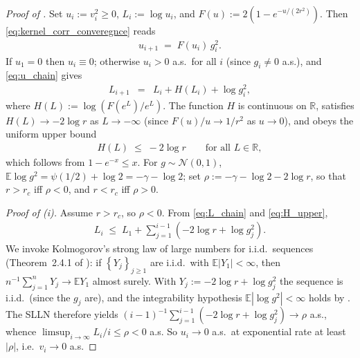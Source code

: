 \documentclass[10pt,a4paper]{amsart}
\newcommand{\Brack}[1]{\left( #1 \right)}
\newcommand{\Exp}[1]{\mathbb{E} #1}
\newcommand{\RR}{\mathbb{R}}
\newcommand{\Set}[1]{\left\{ #1 \right\}}
\newcommand{\mcN}{\mathcal{N}}
\begin{document}
\begin{proof}[Proof of ]
  Set $u_i := v_i^2 \ge 0$, $L_i := \log u_i$, and $F(u) := 2(1 - e^{-u/(2r^2)})$. Then \eqref{eq:kernel_corr_converegnce} reads
  \begin{eqnarray}
    \label{eq:u_chain}
    u_{i+1} \;=\; F(u_i)\,g_i^2.
  \end{eqnarray}
  If $u_1 = 0$ then $u_i \equiv 0$; otherwise $u_i > 0$ a.s.\ for all $i$ (since $g_i \ne 0$ a.s.), and \eqref{eq:u_chain} gives
  \begin{eqnarray}
    \label{eq:L_chain}
    L_{i+1} & = & L_i + H(L_i) + \log g_i^2,
  \end{eqnarray}
  where $H(L) := \log\Brack{F(e^L)/e^L}$.
  The function $H$ is continuous on $\RR$, satisfies $H(L) \to -2\log r$ as $L \to -\infty$ (since $F(u)/u \to 1/r^2$ as $u \to 0$), and obeys the uniform upper bound
  \begin{eqnarray}
    \label{eq:H_upper}
    H(L) \;\le\; -2\log r \qquad \text{for all } L \in \RR,
  \end{eqnarray}
  which follows from $1 - e^{-x} \le x$. For $g \sim \mcN(0,1)$, $\Exp{\log g^2} = \psi(1/2) + \log 2 = -\gamma - \log 2$; set $\rho := -\gamma - \log 2 - 2\log r$, so that $r > r_c$ iff $\rho < 0$, and $r < r_c$ iff $\rho > 0$.

  \emph{Proof of (i).} Assume $r > r_c$, so $\rho < 0$. From \eqref{eq:L_chain} and \eqref{eq:H_upper},
  \begin{eqnarray*}
    L_i \;\le\; L_1 + \sum_{j=1}^{i-1}\Brack{-2\log r + \log g_j^2}.
  \end{eqnarray*}
  We invoke Kolmogorov's strong law of large numbers for i.i.d.\ sequences (Theorem~2.4.1 of \cite{durrett2019probability}): if $\Set{Y_j}_{j \ge 1}$ are i.i.d.\ with $\Exp{|Y_1|} < \infty$, then $n^{-1}\sum_{j=1}^n Y_j \to \Exp{Y_1}$ almost surely. With $Y_j := -2\log r + \log g_j^2$ the sequence is i.i.d.\ (since the $g_j$ are), and the integrability hypothesis $\Exp{|\log g^2|} < \infty$ holds by . The SLLN therefore yields $(i-1)^{-1}\sum_{j=1}^{i-1}(-2\log r + \log g_j^2) \to \rho$ a.s., whence $\limsup_{i\to\infty} L_i/i \le \rho < 0$ a.s. So $u_i \to 0$ a.s.\ at exponential rate at least $|\rho|$, i.e.\ $v_i \to 0$ a.s.


\end{proof}
\end{document}
